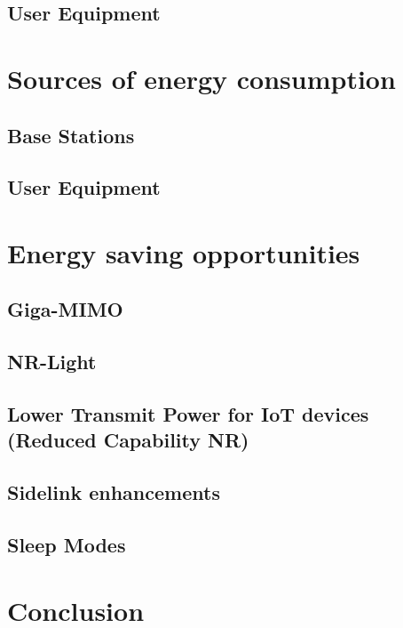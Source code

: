 \documentclass[11pt,a4paper]{article}
\begin{document}
\subsection{User Equipment}

\section{Sources of energy consumption}
\subsection{Base Stations}
\subsection{User Equipment}

\section{Energy saving opportunities}
\subsection{Giga-MIMO}
\subsection{NR-Light}
\subsection{Lower Transmit Power for IoT devices (Reduced Capability NR)}
\subsection{Sidelink enhancements}
\subsection{Sleep Modes}

\section{Conclusion}

\clearpage

\appendix
\nocite{*}
\renewcommand*{\refname}{\section{References}}
{}
\end{document}
